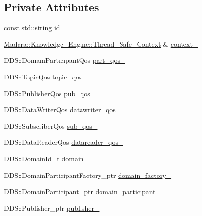 \subsection*{Private Attributes}
\begin{DoxyCompactItemize}
\item 
const std::string \hyperlink{classMadara_1_1Transport_1_1Splice__DDS__Transport_af85f76783ac455c788ddeb62505b40c9}{id\_\-}
\item 
\hyperlink{classMadara_1_1Knowledge__Engine_1_1Thread__Safe__Context}{Madara::Knowledge\_\-Engine::Thread\_\-Safe\_\-Context} \& \hyperlink{classMadara_1_1Transport_1_1Splice__DDS__Transport_ab18015166a827a7502030b16b1d0b489}{context\_\-}
\item 
DDS::DomainParticipantQos \hyperlink{classMadara_1_1Transport_1_1Splice__DDS__Transport_ad77310b0ee1cebb506c4cbf01e273085}{part\_\-qos\_\-}
\item 
DDS::TopicQos \hyperlink{classMadara_1_1Transport_1_1Splice__DDS__Transport_a143c960e01bc4c0cef1cde27af324082}{topic\_\-qos\_\-}
\item 
DDS::PublisherQos \hyperlink{classMadara_1_1Transport_1_1Splice__DDS__Transport_a2646428c9bdc4681983e1ad98c188176}{pub\_\-qos\_\-}
\item 
DDS::DataWriterQos \hyperlink{classMadara_1_1Transport_1_1Splice__DDS__Transport_a0bff6e853ea4b323063c61d461108f0b}{datawriter\_\-qos\_\-}
\item 
DDS::SubscriberQos \hyperlink{classMadara_1_1Transport_1_1Splice__DDS__Transport_a681519cff73607a11505c71be751e78c}{sub\_\-qos\_\-}
\item 
DDS::DataReaderQos \hyperlink{classMadara_1_1Transport_1_1Splice__DDS__Transport_a8e1613bba47e72e2b321dda7271440b5}{datareader\_\-qos\_\-}
\item 
DDS::DomainId\_\-t \hyperlink{classMadara_1_1Transport_1_1Splice__DDS__Transport_ad4baf77a65e9c4482f316e34a50f63f7}{domain\_\-}
\item 
DDS::DomainParticipantFactory\_\-ptr \hyperlink{classMadara_1_1Transport_1_1Splice__DDS__Transport_a15644b7cf6856d20688247ccf29d6770}{domain\_\-factory\_\-}
\item 
DDS::DomainParticipant\_\-ptr \hyperlink{classMadara_1_1Transport_1_1Splice__DDS__Transport_aa4c09fbf66b1cd917a625660394b8be7}{domain\_\-participant\_\-}
\item 
DDS::Publisher\_\-ptr \hyperlink{classMadara_1_1Transport_1_1Splice__DDS__Transport_a7238303bb1ebaa6f577685282114938d}{publisher\_\-}
\item 

\end{DoxyCompactItemize}
